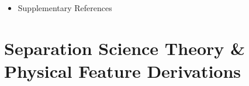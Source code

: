 \documentclass[11pt]{article}
\begin{document}
\begin{itemize}[leftmargin=1.5cm, label=$\blacktriangleright$]
    \begin{itemize}[label=$\circ$]
        \item S5.1: Representative Case Definition (Ibuprofen on Commercial FilmTec NF90)
        \item S5.2: Stage 1: Explicit Physics-Informed Feature Engineering (From Scratch)
        \item S5.3: Stage 2: Deep Neural Stream (PhysiChem-GT) Graph Processing
        \item S5.4: Stage 3: Monotonic Physics Booster (PhysiChem-XGB) Tree Evaluation
        \item S5.5: Stage 4: Hydrodynamic Gating, Blending, and Hard-Constraint Enforcement
        \item S5.6: Comprehensive Numerical Trace \& Ground-Truth Validation
    \end{itemize}
    \item Supplementary References
\end{itemize}

\newpage

\section{Separation Science Theory \& Physical Feature Derivations}
\label{sec:theory}
\end{document}
